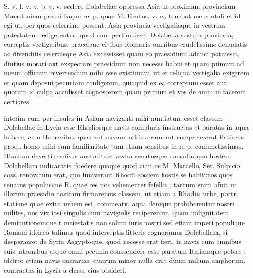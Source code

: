 


 S. v. l. v. v. b. e. v. scelere Dolabellae oppressa Asia in proximam provinciam Macedoniam praesidiaque rei p. quae M. Brutus, v. c., tenebat me contuli et id egi ut, per quos celerrime possent, Asia provincia vectigaliaque in vestram potestatem redigerentur. quod cum pertimuisset Dolabella vastata provincia, correptis vectigalibus, praecipue civibus Romanis omnibus crudelissime denudatis ac divenditis celeriusque Asia excessisset quam eo praesidium adduci potuisset, diutius morari aut exspectare praesidium non necesse habui et quam primum ad meum officium revertendum mihi esse existimavi, ut et reliqua vectigalia exigerem et quam deposui pecuniam conligerem, quicquid ex ea correptum esset aut quorum id culpa accidisset cognoscerem quam primum et vos de omni re facerem certiores.

 interim cum per insulas in Asiam naviganti mihi nuntiatum esset classem Dolabellae in Lycia esse Rhodiosque navis compluris instructas et paratas in aqua habere, cum Hs navibus quas aut mecum adduxeram aut comparaverat Patiscus proq., homo mihi cum familiaritate tum etiam sensibus in re p. coniunctissimus, Rhodum deverti confisus auctoritate vestra senatusque consulto quo hostem Dolabellam iudicaratis, foedere quoque quod cum iis M. Marcello, Ser. Sulpicio coss. renovatum erat, quo iuraverant Rhodii eosdem hostis se habituros quos senatus populusque R. quae res nos vehementer fefellit ; tantum enim afuit ut illorum praesidio nostram firmaremus classem, ut etiam a Rhodiis urbe, portu, statione quae extra urbem est, commeatu, aqua denique prohiberentur nostri milites, nos vix ipsi singulis cum navigiolis reciperemur. quam indignitatem deminutionemque t maiestatis non solum iuris nostri sed etiam imperi populique Romani idcirco tulimus quod interceptis litteris cognoramus Dolabellam, si desperasset de Syria Aegyptoque, quod necesse erat fieri, in navis cum omnibus suis latronibus atque omni pecunia conscendere esse paratum Italiamque petere ; idcirco etiam navis onerarias, quarum minor nulla erat duum milium amphorum, contractas in Lycia a classe eius obsideri.

